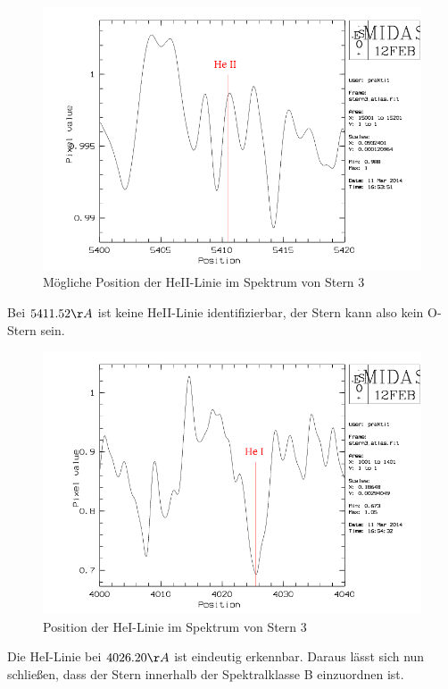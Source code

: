 \begin{figure}
\includegraphics[height=.4\textheight]{images/stern3_HeII.png}
\caption{Mögliche Position der HeII-Linie im Spektrum von Stern 3}
\label{fig:stern3_HeII}
\end{figure}
Bei $5411.52 \AA$ ist keine HeII-Linie identifizierbar, der Stern kann also kein O-Stern sein.
\\
\begin{figure}
\includegraphics[height=.4\textheight]{images/stern3_HeI.png}
\caption{Position der HeI-Linie im Spektrum von Stern 3}
\label{fig:stern3_HeI}
\end{figure}
Die HeI-Linie bei $4026.20 \AA$ ist eindeutig erkennbar. Daraus lässt sich nun schließen, dass der Stern innerhalb der Spektralklasse B einzuordnen ist.

\newpage
